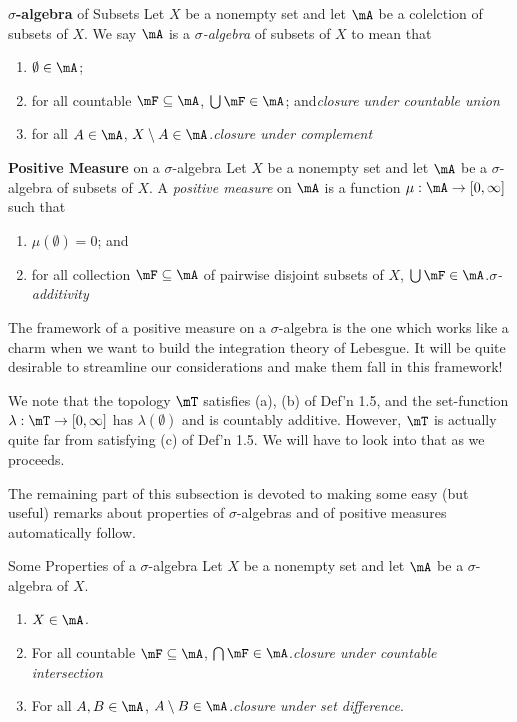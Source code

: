 \documentclass[pmath450]{subfiles}
\begin{document}
    \begin{definition}{\textbf{$\sigma$-algebra} of Subsets}
        Let $X$ be a nonempty set and let $\mA$ be a colelction of subsets of $X$. We say $\mA$ is a \emph{$\sigma$-algebra} of subsets of $X$ to mean that
        \begin{enumerate}
            \item $\emptyset\in\mA$;
            \item for all countable $\mF\subseteq\mA$, $\bigcup\mF\in\mA$; and\hfill\textit{closure under countable union}
            \item for all $A\in\mA$, $X\setminus A\in\mA$.\hfill\textit{closure under complement}
        \end{enumerate}
    \end{definition}

    \begin{definition}{\textbf{Positive Measure} on a $\sigma$-algebra}
        Let $X$ be a nonempty set and let $\mA$ be a $\sigma$-algebra of subsets of $X$. A \emph{positive measure} on $\mA$ is a function $\mu:\mA\to\left[ 0,\infty \right]$ such that
        \begin{enumerate}
            \item $\mu\left( \emptyset \right)=0$; and
            \item for all collection $\mF\subseteq\mA$ of pairwise disjoint subsets of $X$, $\bigcup\mF\in\mA$.\hfill\textit{$\sigma$-additivity}
        \end{enumerate}
    \end{definition}

    \np The framework of a positive measure on a $\sigma$-algebra is the one which works like a charm when we want to build the integration theory of Lebesgue. It will be quite desirable to streamline our considerations and make them fall in this framework!

    We note that the topology $\mT$ satisfies (a), (b) of Def'n 1.5, and the set-function $\lambda:\mT\to\left[ 0,\infty \right]$ has $\lambda\left( \emptyset \right)$ and is countably additive. However, $\mT$ is actually quite far from satisfying (c) of Def'n 1.5. We will have to look into that as we proceeds.

    The remaining part of this subsection is devoted to making some easy (but useful) remarks about properties of $\sigma$-algebras and of positive measures automatically follow.

    \clearpage
    \begin{prop}{Some Properties of a $\sigma$-algebra}
        Let $X$ be a nonempty set and let $\mA$ be a $\sigma$-algebra of $X$.
        \begin{enumerate}
            \item $X\in\mA$.
            \item For all countable $\mF\subseteq\mA$, $\bigcap\mF\in\mA$.\hfill\textit{closure under countable intersection}
            \item For all $A,B\in\mA$, $A\setminus B\in\mA$.\hfill\textit{closure under set difference}.
        \end{enumerate}
    \end{prop}
\end{document}
